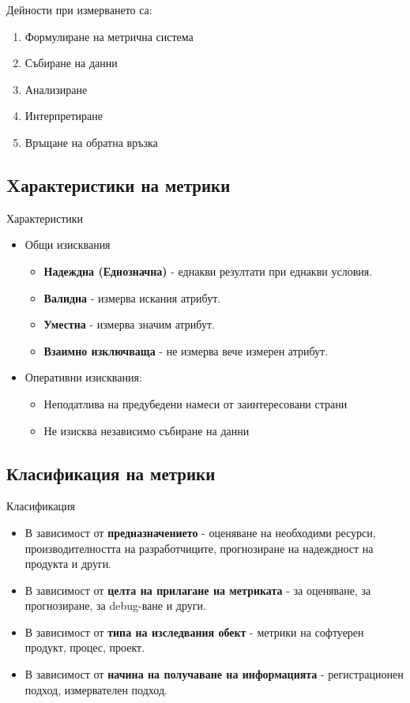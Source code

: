 \documentclass[fleqn,12pt]{article}
\begin{document}
Дейности при измерването са:
\begin{enumerate}
    \item Формулиране на метрична система
    \item Събиране на данни
    \item Анализиране
    \item Интерпретиране
    \item Връщане на обратна връзка
\end{enumerate}

\subsection{Xарактеристики на метрики}

Характеристики
\begin{itemize}
    \item Общи изисквания
        \begin{itemize}
            \item \textbf{Надеждна (Еднозначна)} - еднакви резултати при еднакви условия.
            \item \textbf{Валидна} - измерва искания атрибут.
            \item \textbf{Уместна} - измерва значим атрибут.
            \item \textbf{Взаимно изключваща} - не измерва вече измерен атрибут.
        \end{itemize}
    \item Оперативни изисквания:
    \begin{itemize}
        \item Неподатлива на предубедени намеси от заинтересовани страни
        \item Не изисква независимо събиране на данни
    \end{itemize}
\end{itemize}

\subsection{Класификация на метрики}

Класификация
\begin{itemize}
    \item В зависимост от \textbf{предназначението} - оценяване на необходими ресурси, производителността на разработчиците, прогнозиране на надеждност на продукта и други.
    \item В зависимост от \textbf{целта на прилагане на метриката} - за оценяване, за прогнозиране, за debug-ване и други.
    \item В зависимост от \textbf{типа на изследвания обект} - метрики на софтуерен продукт, процес, проект.
    \item В зависимост от \textbf{начина на получаване на информацията} - регистрационен подход, измервателен подход.
\end{itemize}
\end{document}
